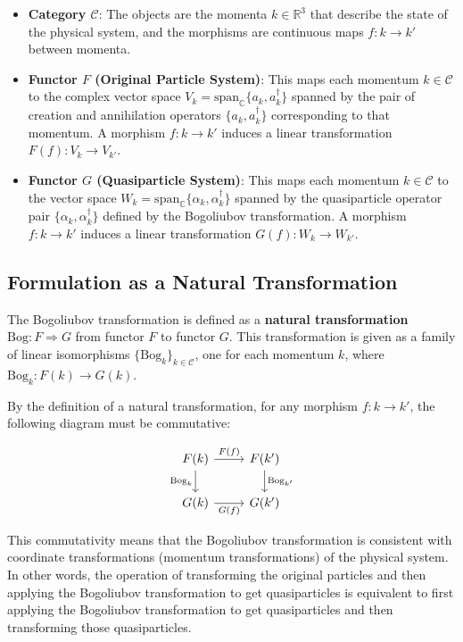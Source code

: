 \documentclass[uplatex,a4j,12pt,dvipdfmx]{article}
\begin{document}
\begin{itemize}
    \item \textbf{Category $\mathcal{C}$}: The objects are the momenta $k \in \mathbb{R}^3$ that describe the state of the physical system, and the morphisms are continuous maps $f: k \to k'$ between momenta.
    \item \textbf{Functor $F$ (Original Particle System)}: This maps each momentum $k \in \mathcal{C}$ to the complex vector space $V_{k} = \mathrm{span}_\mathbb{C}\{a_{k}, a_{k}^{\dagger}\}$ spanned by the pair of creation and annihilation operators $\{a_{k}, a_{k}^{\dagger}\}$ corresponding to that momentum. A morphism $f: k \to k'$ induces a linear transformation $F(f): V_{k} \to V_{k'}$.
    \item \textbf{Functor $G$ (Quasiparticle System)}: This maps each momentum $k \in \mathcal{C}$ to the vector space $W_{k} = \mathrm{span}_\mathbb{C}\{\alpha_{k}, \alpha_{k}^{\dagger}\}$ spanned by the quasiparticle operator pair $\{\alpha_{k}, \alpha_{k}^{\dagger}\}$ defined by the Bogoliubov transformation. A morphism $f: k \to k'$ induces a linear transformation $G(f): W_{k} \to W_{k'}$.
\end{itemize}

\subsection{Formulation as a Natural Transformation}

The Bogoliubov transformation is defined as a \textbf{natural transformation} $\text{Bog}: F \Rightarrow G$ from functor $F$ to functor $G$. This transformation is given as a family of linear isomorphisms $\{\text{Bog}_{k}\}_{k \in \mathcal{C}}$, one for each momentum $k$, where $\text{Bog}_{k}: F(k) \to G(k)$.

By the definition of a natural transformation, for any morphism $f: k \to k'$, the following diagram must be commutative:

\[
	\begin{tikzcd}
		F(k) \arrow[r, "F(f)"] \arrow[d, "\text{Bog}_{k}"'] & F(k') \arrow[d, "\text{Bog}_{k'}"] \\
		G(k) \arrow[r, "G(f)"'] & G(k')
	\end{tikzcd}
\]

This commutativity means that the Bogoliubov transformation is consistent with coordinate transformations (momentum transformations) of the physical system. In other words, the operation of transforming the original particles and then applying the Bogoliubov transformation to get quasiparticles is equivalent to first applying the Bogoliubov transformation to get quasiparticles and then transforming those quasiparticles.
\end{document}
